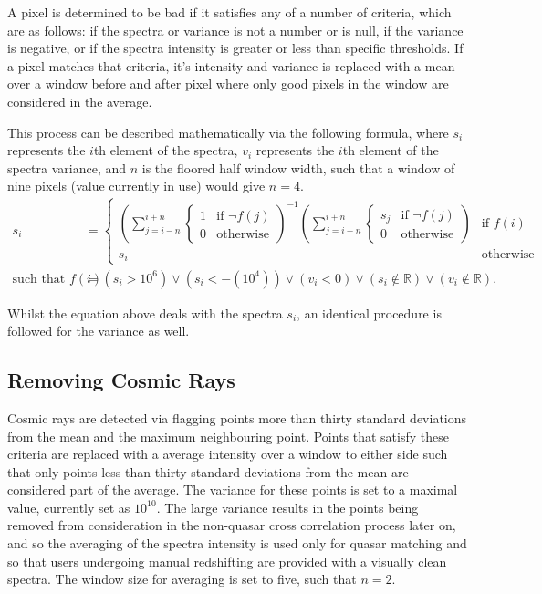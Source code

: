 \documentclass[titlesmallcaps, examinerscopy, copyrightpage]{uqthesis}
\newcommand{\brac}[1]{\left( #1 \right)}
\begin{document}
A pixel is determined to be bad if it satisfies any of a number of criteria, which are as follows: if the spectra or variance is not a number or is null, if the variance is negative, or if the spectra intensity is greater or less than specific thresholds. If a pixel matches that criteria, it's intensity and variance is replaced with a mean over a window before and after pixel where only good pixels in the window are considered in the average.

This process can be described mathematically via the following formula, where $s_i$ represents the $i$th element of the spectra, $v_i$ represents the $i$th element of the spectra variance, and $n$ is the floored half window width, such that a window of nine pixels (value currently in use) would give $n=4$.
\begin{align}
s_i &= 
\begin{cases}
	\brac{\sum\limits_{j=i-n}^{i+n} \begin{cases}1 & \text{if } \lnot f(j) \\ 0 & \text{otherwise} \end{cases}}^{-1}\brac{\sum\limits_{j=i-n}^{i+n} \begin{cases}s_j & \text{if } \lnot f(j) \\ 0 & \text{otherwise} \end{cases}} & \text{if } f(i) \\
	s_i & \text{otherwise}
\end{cases}\\
\text{such that } f(i) &= \brac{s_i > 10^6} \vee \brac{s_i <  -\left(10^4\right)} \vee \brac{v_i < 0} \vee \brac{s_i \notin \mathbb{R}} \vee \brac{v_i \notin \mathbb{R}}.
\end{align} 

Whilst the equation above deals with the spectra $s_i$, an identical procedure is followed for the variance as well.

\pagebreak
\subsection{Removing Cosmic Rays}

Cosmic rays are detected via flagging points more than thirty standard deviations from the mean and the maximum neighbouring point. Points that satisfy these criteria are replaced with a average intensity over a window to either side such that only points less than thirty standard deviations from the mean are considered part of the average. The variance for these points is set to a maximal value, currently set as $10^{10}$. The large variance results in the points being removed from consideration in the non-quasar cross correlation process later on, and so the averaging of the spectra intensity is used only for quasar matching and so that users undergoing manual redshifting are provided with a visually clean spectra. The window size for averaging is set to five, such that $n = 2$.
\end{document}
